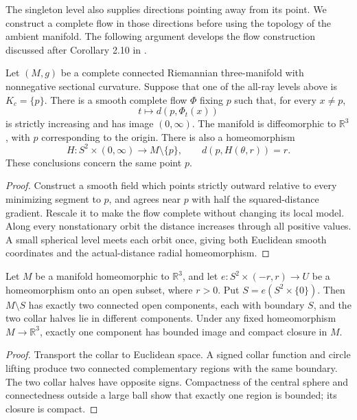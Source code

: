 The singleton level also supplies directions pointing away from its
point.  We construct a complete flow in those directions before using
the topology of the ambient manifold.  The following argument develops
the flow construction discussed after Corollary 2.10 in
\cite[p. 27]{MT2007}.

\begin{lemma}
\label{lem:ancient-soul-coordinates}
Let $(M,g)$ be a complete connected Riemannian three-manifold with
nonnegative sectional curvature.  Suppose that one of the all-ray
levels above is $K_c=\{p\}$.  There is a smooth complete flow $\Phi$
fixing $p$ such that, for every $x\ne p$,
\[
             t\longmapsto d(p,\Phi_t(x))
\]
is strictly increasing and has image $(0,\infty)$.
The manifold is diffeomorphic to $\mathbb R^3$, with $p$ corresponding
to the origin.  There is also a homeomorphism
\[
 H:S^2\times(0,\infty)\longrightarrow M\setminus\{p\},
 \qquad d(p,H(\theta,r))=r.
\]
These conclusions concern the same point $p$.
\end{lemma}
\begin{proof}
Construct a smooth field which points strictly outward relative to every
minimizing segment to $p$, and agrees near $p$ with half the squared-distance
gradient. Rescale it to make the flow complete without changing its local
model. Along every nonstationary orbit the distance increases through all
positive values. A small spherical level meets each orbit once, giving both
Euclidean smooth coordinates and the actual-distance radial homeomorphism.
\end{proof}

\begin{lemma}
\label{lem:ancient-collar-sides}
Let $M$ be a manifold homeomorphic to $\mathbb R^3$, and let
$e:S^2\times(-r,r)\to U$ be a homeomorphism onto an open subset,
where $r>0$.  Put $S=e(S^2\times\{0\})$.
Then $M\setminus S$ has exactly two connected open components,
each with boundary $S$, and the two collar halves lie in different
components.  Under any fixed homeomorphism $M\to\mathbb R^3$,
exactly one component has bounded image and compact closure in $M$.
\end{lemma}
\begin{proof}
Transport the collar to Euclidean space. A signed collar function and circle
lifting produce two connected complementary regions with the same boundary.
The two collar halves have opposite signs. Compactness of the central sphere
and connectedness outside a large ball show that exactly one region is
bounded; its closure is compact.
\end{proof}

